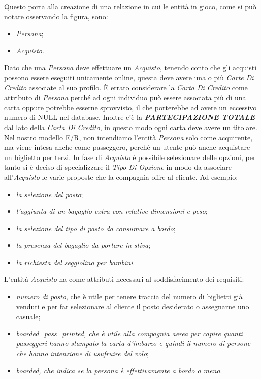 Questo porta alla creazione di una relazione in cui le entità in gioco, come si può notare osservando la figura, sono:

\begin{itemize}

\item{\textit{Persona}};
\item{\textit{Acquisto}}.
\end{itemize}

Dato che una \textit{Persona} deve effettuare un \textit{Acquisto}, tenendo conto che gli acquisti possono essere eseguiti unicamente online, questa deve avere una o più \textit{Carte Di Credito} associate al suo profilo. È errato considerare la \textit{Carta Di Credito} come attributo di \textit{Persona} perché ad ogni individuo può essere associata più di una carta oppure potrebbe esserne sprovvisto, il che porterebbe ad avere un eccessivo numero di NULL nel database. Inoltre c’è la \textit{\textbf{PARTECIPAZIONE TOTALE}} dal lato della \textit{Carta Di Credito}, in questo modo ogni carta deve avere un titolare. Nel nostro modello E/R, non intendiamo l’entità \textit{Persona} solo come acquirente, ma viene intesa anche come passeggero, perché un utente può anche acquistare un biglietto per terzi.
In fase di \textit{Acquisto} è possibile selezionare delle opzioni, per tanto si è deciso di specializzare il \textit{Tipo Di Opzione} in modo da associare all’\textit{Acquisto} le varie proposte che la compagnia offre al cliente. Ad esempio:

\begin{itemize}

\item \textit{la selezione del posto};
\item \textit{l’aggiunta di un bagaglio extra con relative dimensioni e peso};
\item \textit{la selezione del tipo di pasto da consumare a bordo};
\item \textit{la presenza del bagaglio da portare in stiva};
\item \textit{la richiesta del seggiolino per bambini}.

\end{itemize}

L’entità \textit{Acquisto} ha come attributi necessari al soddisfacimento dei requisiti:

\begin{itemize}

\item \textit{numero di posto}, che è utile per tenere traccia del numero di biglietti già venduti e per far selezionare al cliente il posto desiderato o assegnarne uno casuale;
\item \textit{boarded\_pass\_printed, che è utile alla compagnia aerea per capire quanti passeggeri hanno stampato la carta d’imbarco e quindi il numero di persone che hanno intenzione di usufruire del volo};
\item \textit{boarded, che indica se la persona è effettivamente a bordo o meno}.

\end{itemize}

